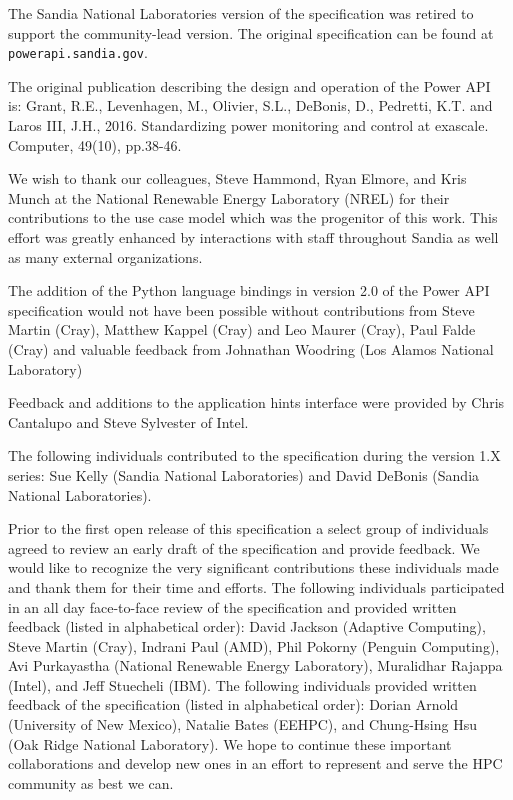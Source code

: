 \documentclass[12pt]{report}
\begin{document}
The Sandia National Laboratories version of the specification was retired to support the community-lead version. The original specification can be found at \texttt{powerapi.sandia.gov}. 

The original publication describing the design and operation of the Power API~\cite{grant2016standardizing} is: Grant, R.E., Levenhagen, M., Olivier, S.L., DeBonis, D., Pedretti, K.T. and Laros III, J.H., 2016. Standardizing power monitoring and control at exascale. Computer, 49(10), pp.38-46. 

We wish to thank our colleagues, Steve Hammond, Ryan Elmore, and Kris Munch at the National Renewable Energy Laboratory (NREL) for their contributions to the use case model which was the progenitor of this work.
This effort was greatly enhanced by interactions with staff throughout Sandia as well as many external organizations. 

The addition of the Python language bindings in version 2.0 of the Power API specification would not have been possible without contributions from Steve Martin (Cray), Matthew Kappel (Cray) and Leo Maurer (Cray), Paul Falde (Cray) and valuable feedback from Johnathan Woodring (Los Alamos National Laboratory)

Feedback and additions to the application hints interface were provided by Chris Cantalupo and Steve Sylvester of Intel.

The following individuals contributed to the specification during the version 1.X series: Sue Kelly (Sandia National Laboratories) and David DeBonis (Sandia National Laboratories). 

Prior to the first open release of this specification a select group of individuals agreed to review an early draft of the specification and provide feedback. 
We would like to recognize the very significant contributions these individuals made and thank them for their time and efforts. 
The following individuals participated in an all day face-to-face review of the specification and provided written feedback (listed in alphabetical order): David Jackson (Adaptive Computing), Steve Martin (Cray), Indrani Paul (AMD), Phil Pokorny (Penguin Computing), Avi Purkayastha (National Renewable Energy Laboratory), Muralidhar Rajappa (Intel), and Jeff Stuecheli (IBM).
The following individuals provided written feedback of the specification (listed in alphabetical order): Dorian Arnold (University of New Mexico), Natalie Bates (EEHPC), and Chung-Hsing Hsu (Oak Ridge National Laboratory).
We hope to continue these important collaborations and develop new ones in an effort to represent and serve the HPC community as best we can.
\end{document}

